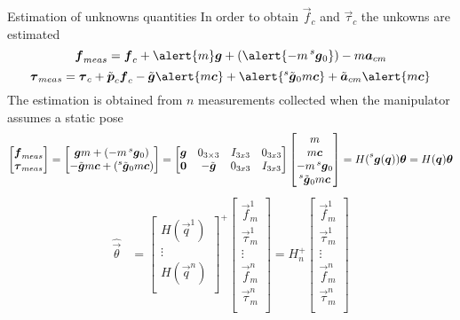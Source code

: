 \begin{frame}[shrink=20]{Estimation of unknowns quantities}
  In order to obtain $\vec{f}_{c}$ and $\vec{\tau}_{c}$ the \alert{unkowns} are estimated
  \[
  \vec{f}_{meas} = \vec{f}_{c} +\alert{m} \vec{g} +(\alert{-m \prescript{s}{}{ \vec{g}}_{0}}) - m  \vec{a}_{cm}
  \]
  \[
  \vec{\tau}_{meas} = \vec{\tau}_{c} + \tilde{\vec{p}}_{c}  \vec{f}_{c}
  - \tilde{\vec{g}} \alert{m\vec{c}} + \alert{\prescript{s}{}{ \tilde{\vec{g}}}_{0} m\vec{c}} +  \tilde{\vec{a}}_{cm} \alert{m  \vec{c}}
  \]
  The estimation is obtained from $n$ measurements collected when the manipulator assumes a static pose
  \[
  \begin{bmatrix}
    \vec{f}_{meas} \\
    \vec{\tau}_{meas}
  \end{bmatrix} =
  \begin{bmatrix}
    \vec{g} m + (-m \prescript{s}{}{ \vec{g}}_{0}) \\
    -\tilde{\vec{g}} m\vec{c} + (\prescript{s}{}{ \tilde{\vec{g}}}_{0} m\vec{c})
  \end{bmatrix}
  =
  \begin{bmatrix}
    \vec{g} & 0_{3 \times 3} & I_{3x3} & 0_{3x3} \\
    \vec{0} & -\tilde{\vec{g}} & 0_{3x3} & I_{3x3}
  \end{bmatrix}
  \begin{bmatrix}
    m \\
    m \vec{c} \\
    -m \prescript{s}{}{ \vec{g}}_{0} \\
    \prescript{s}{}{ \tilde{\vec{g}}}_{0} m\vec{c}
  \end{bmatrix}
  =
  H(\prescript{s}{}{\vec{g}(\vec{q})}) \vec{\theta}
  =
  H(\vec{q}) \vec{\theta}
  \]
  \[
  \begin{split}
    \hat{\vec{\theta}} &=
    \begin{bmatrix}
      H(\vec{q}^{1})\\
      \vdots \\
      H(\vec{q}^{n})\\
    \end{bmatrix}^{+}
    \begin{bmatrix}
      \vec{f}_{m}^{1} \\
      \vec{\tau}_{m}^{1} \\
      \vdots \\
      \vec{f}_{m}^{n} \\
      \vec{\tau}_{m}^{n} \\
    \end{bmatrix}
    =
    H_n^{+}
    \begin{bmatrix}
      \vec{f}_{m}^{1} \\
      \vec{\tau}_{m}^{1} \\
      \vdots \\
      \vec{f}_{m}^{n} \\
      \vec{\tau}_{m}^{n} \\
    \end{bmatrix}\\
  \end{split}
  \]
\end{frame}

